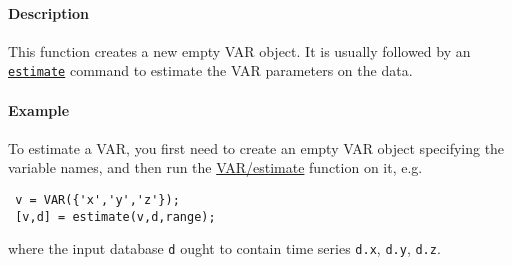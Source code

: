  \paragraph{Description}
 
 This function creates a new empty VAR object. It is usually followed by
 an \href{VAR/estimate}{\texttt{estimate}} command to estimate the VAR
 parameters on the data.
 
 \paragraph{Example}
 
 To estimate a VAR, you first need to create an empty VAR object
 specifying the variable names, and then run the
 \href{VAR/estimate}{VAR/estimate} function on it, e.g.
 
 \begin{verbatim}
 v = VAR({'x','y','z'});
 [v,d] = estimate(v,d,range);
 \end{verbatim}
 
 where the input database \texttt{d} ought to contain time series
 \texttt{d.x}, \texttt{d.y}, \texttt{d.z}.



